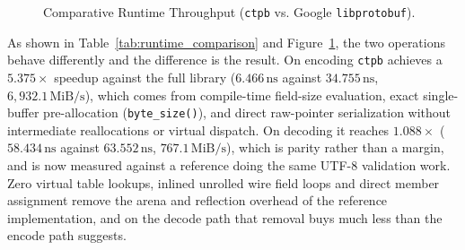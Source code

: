 \begin{figure}[ht]
\centering
{}
\caption{Comparative Runtime Throughput (\texttt{ctpb} vs. Google \texttt{libprotobuf}).}
\label{fig:runtime_throughput}
\end{figure}

As shown in Table~\ref{tab:runtime_comparison} and Figure~\ref{fig:runtime_throughput}, the two operations behave differently and the difference is the result. On encoding \texttt{ctpb} achieves a $\mathbf{5.375\times}$ speedup against the full library ($6.466\,\text{ns}$ against $34.755\,\text{ns}$, $6{,}932.1\,\text{MiB/s}$), which comes from compile-time field-size evaluation, exact single-buffer pre-allocation (\texttt{byte\_size()}), and direct raw-pointer serialization without intermediate reallocations or virtual dispatch. On decoding it reaches $\mathbf{1.088\times}$ ($58.434\,\text{ns}$ against $63.552\,\text{ns}$, $767.1\,\text{MiB/s}$), which is parity rather than a margin, and is now measured against a reference doing the same UTF-8 validation work. Zero virtual table lookups, inlined unrolled wire field loops and direct member assignment remove the arena and reflection overhead of the reference implementation, and on the decode path that removal buys much less than the encode path suggests.

